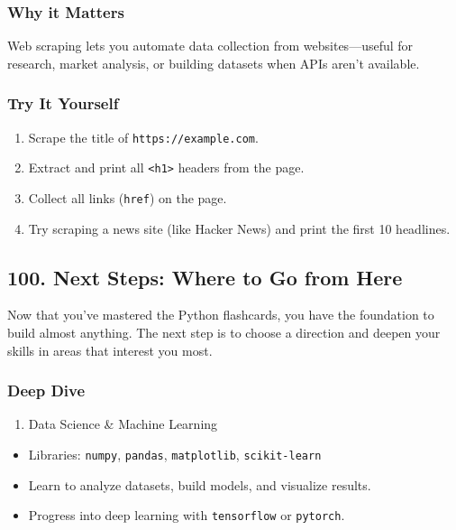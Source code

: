 \documentclass[
  letterpaper,
  DIV=11,
  numbers=noendperiod]{scrreprt}
\providecommand{\tightlist}{%
  \setlength{\itemsep}{0pt}\setlength{\parskip}{0pt}}
\begin{document}
\subsubsection{Why it Matters}\label{why-it-matters-98}

Web scraping lets you automate data collection from websites---useful
for research, market analysis, or building datasets when APIs aren't
available.

\subsubsection{Try It Yourself}\label{try-it-yourself-98}

\begin{enumerate}
\def\labelenumi{\arabic{enumi}.}
\tightlist
\item
  Scrape the title of \texttt{https://example.com}.
\item
  Extract and print all \texttt{\textless{}h1\textgreater{}} headers
  from the page.
\item
  Collect all links (\texttt{href}) on the page.
\item
  Try scraping a news site (like Hacker News) and print the first 10
  headlines.
\end{enumerate}

\subsection{100. Next Steps: Where to Go from
Here}\label{next-steps-where-to-go-from-here}

Now that you've mastered the Python flashcards, you have the foundation
to build almost anything. The next step is to choose a direction and
deepen your skills in areas that interest you most.

\subsubsection{Deep Dive}\label{deep-dive-99}

\begin{enumerate}
\def\labelenumi{\arabic{enumi}.}
\tightlist
\item
  Data Science \& Machine Learning
\end{enumerate}

\begin{itemize}
\tightlist
\item
  Libraries: \texttt{numpy}, \texttt{pandas}, \texttt{matplotlib},
  \texttt{scikit-learn}
\item
  Learn to analyze datasets, build models, and visualize results.
\item
  Progress into deep learning with \texttt{tensorflow} or
  \texttt{pytorch}.
\end{itemize}
\end{document}
